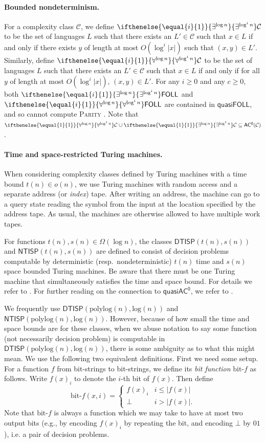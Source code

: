 \documentclass{theoretics}
\newcommand{\algprobm}[1]{\textsc{#1}\xspace}
\newcommand{\betacc}[1]{\ifthenelse{\equal{#1}{1}}{\exists^{\log n}}{\exists^{\log^{#1}n}}} %
\newcommand{\alphacc}[1]{\ifthenelse{\equal{#1}{1}}{\forall^{\log n}}{\forall^{\log^{#1}n}}} %
\newcommand*{\ComplexityClass}[1]{\ensuremath{\mathsf{#1}}\xspace}
\newcommand{\NTISP}{\ComplexityClass{NTISP}}
\newcommand{\DTISP}{\ComplexityClass{DTISP}}
\newcommand{\NTISPpll}{\ensuremath{\NTISP(\mathrm{polylog}(n),\mathrm{log}(n))}\xspace}
\newcommand{\DTISPpll}{\ensuremath{\DTISP(\mathrm{polylog}(n),\mathrm{log}(n))}\xspace}
\newcommand{\ACz}{\ComplexityClass{AC^0}}
\newcommand{\qACz}{\ComplexityClass{quasiAC^0}}
\newcommand{\FOLL}{\ComplexityClass{FOLL}}
\begin{document}
\paragraph{Bounded nondeterminism.} For a complexity class $\mathcal{C}$, we define $\betacc{i}\mathcal{C}$ to be the set of languages $L$ such that there exists an $L' \in \mathcal{C}$ such that $x \in L$ if and only if there exists $y$ of length at most $O(\log^{i} |x|)$ such that $(x, y) \in L'$. Similarly, define $\alphacc{i}\mathcal{C}$ to be the set of languages $L$ such that there exists an $L' \in \mathcal{C}$ such that $x \in L$ if and only if for all $y$ of length at most $O(\log^{i} |x|)$, $(x,y) \in L'$. For any $i \geq 0$ and any $c \geq 0$, both $\betacc{i}\FOLL$ and $\alphacc{i}\FOLL$ are contained in  $\mathsf{quasi}\FOLL$, and so cannot compute \algprobm{Parity} \cite{ChattopadhyayToranWagner, Smolensky87algebraicmethods}. Note that $\alphacc{1}\mathcal{C} \cup  \betacc{1}\mathcal{C}\subseteq \ACz(\mathcal{C})$.

\paragraph{Time and space-restricted Turing machines.}
When considering complexity classes defined by Turing machines with a time bound $t(n) \in o(n)$, we use Turing machines with random access and a separate address (or \emph{index}) tape. After writing an address, the machine can go to a query state reading the symbol from the input at the location specified by the address tape. As usual, the machines are otherwise allowed to have multiple work tapes. 

For functions $t(n), s(n) \in \Omega(\log n)$, the classes $\DTISP(t(n),s(n)) $ and $\NTISP(t(n),s(n)) $ are defined to consist of decision problems computable by deterministic (resp.\ nondeterministic) $t(n)$ time and $s(n)$ space bounded Turing machines. Be aware that there must be one Turing machine that simultaneously satisfies the time and space bound. For details we refer to \cite[Section 2.6]{VollmerText}. For further reading on the connection to \qACz, we refer to \cite{BarringtonQuasipolynomial,FerrarottiGonzalezScheweTurull}.

We frequently use $\DTISPpll$ and $\NTISPpll$. However, because of how small the time and space bounds are for these classes, when we abuse notation to say some function (not necessarily decision problem) is computable in $\DTISPpll$, there is some ambiguity as to what this might mean. We use the following two equivalent definitions. First we need some setup. For a function $f$ from bit-strings to bit-strings, we define its \emph{bit function} $\text{bit-}f$ as follows. Write $f(x)_i$ to denote the $i$-th bit of $f(x)$. Then define
\[
\text{bit-}f(x,i) = \begin{cases}
f(x)_i & i \leq |f(x)| \\
\bot & i > |f(x)|.
\end{cases}
\]
Note that $\text{bit-}f$ is always a function which we may take to have at most two output bits (e.g., by encoding $f(x)_i$ by repeating the bit, and encoding $\bot$ by $01$), i.e. a pair of decision problems.
\end{document}
